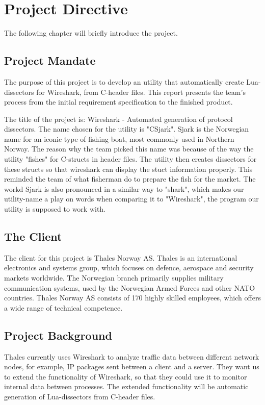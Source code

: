 \chapter{Project Directive}

The following chapter will briefly introduce the project.     

\section{Project Mandate}
The purpose of this project is to develop an utility that automatically create Lua-dissectors for Wireshark, from C-header files. This report presents the team’s process from the initial requirement specification to the finished product. 

The title of the project is: Wireshark - Automated generation of protocol dissectors. The name chosen for the utility is "CSjark". Sjark is the Norwegian name for an iconic type of fishing boat, most commonly used in Northern Norway. The reason why the team picked this name was because of the way the utility "fishes" for C-structs in header files. The utility then creates dissectors for these structs so that wireshark can display the stuct information properly. This reminded the team of what fisherman do to prepare the fish for the market. The workd Sjark is also pronounced in a similar way to "shark", which makes our utility-name a play on words when comparing it to "Wireshark", the program our utility is supposed to work with.

\section{The Client}
The client for this project is Thales Norway AS. Thales is an international electronics and systems group, which focuses on defence, aerospace and security markets worldwide. The Norwegian branch primarily supplies military communication systems, used by the Norwegian Armed Forces and other NATO countries. Thales Norway AS consists of 170 highly skilled employees, which offers a wide range of technical competence.

\section{Project Background}
Thales currently uses Wireshark to analyze traffic data between different network nodes, for example, IP packages sent between a client and a server.
They want us to extend the functionality of Wireshark, so that they could use it to monitor internal data between processes. The extended functionality will be automatic generation of Lua-dissectors from C-header files.

